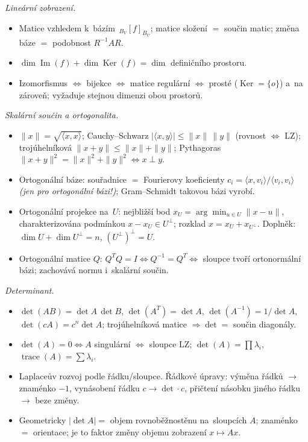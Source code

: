 \documentclass[11pt,a4paper]{article}
\newcommand{\Ker}{\operatorname{Ker}}
\newcommand{\tr}{\operatorname{trace}}
\begin{document}
\begin{poznamka}
\smallskip
\emph{Lineární zobrazení.}
\begin{itemize}
  \item Matice vzhledem k~bázím $\,{}_{B_V}[f]_{B_U}$; matice složení $=$ součin matic; změna báze $=$ podobnost $R^{-1}AR$.
  \item $\dim\operatorname{Im}(f)+\dim\Ker(f)=\dim$ definičního prostoru.
  \item Izomorfismus $\iff$ bijekce $\iff$ matice regulární $\iff$ prosté ($\Ker=\{o\}$) a~na zároveň; vyžaduje stejnou dimenzi obou prostorů.
\end{itemize}

\smallskip
\emph{Skalární součin a ortogonalita.}
\begin{itemize}
  \item $\|x\|=\sqrt{\langle x,x\rangle}$; Cauchy--Schwarz $|\langle x,y\rangle|\le\|x\|\,\|y\|$ (rovnost $\iff$ LZ); trojúhelníková $\|x+y\|\le\|x\|+\|y\|$; Pythagoras $\|x+y\|^2=\|x\|^2+\|y\|^2\iff x\perp y$.
  \item Ortogonální báze: souřadnice $=$ Fourierovy koeficienty $c_i=\langle x,v_i\rangle/\langle v_i,v_i\rangle$ \emph{(jen pro ortogonální bázi!)}; Gram--Schmidt takovou bázi vyrobí.
  \item Ortogonální projekce na~$U$: nejbližší bod $x_U=\arg\min_{u\in U}\|x-u\|$, charakterizována podmínkou $x-x_U\in U^\perp$; rozklad $x=x_U+x_{U^\perp}$. Doplněk: $\dim U+\dim U^\perp=n$, $(U^\perp)^\perp=U$.
  \item Ortogonální matice $Q$: $Q^TQ=I\iff Q^{-1}=Q^T\iff$ sloupce tvoří ortonormální bázi; zachovává normu i~skalární součin.
\end{itemize}

\smallskip
\emph{Determinant.}
\begin{itemize}
  \item $\det(AB)=\det A\,\det B$, $\det(A^T)=\det A$, $\det(A^{-1})=1/\det A$, $\det(cA)=c^n\det A$; trojúhelníková matice $\Rightarrow\det=$ součin diagonály.
  \item $\det(A)=0\iff A$ singulární $\iff$ sloupce LZ; $\det(A)=\prod\lambda_i$, $\tr(A)=\sum\lambda_i$.
  \item Laplaceův rozvoj podle řádku/sloupce. Řádkové úpravy: výměna řádků $\to$ znaménko $-1$, vynásobení řádku $c\to\det\cdot c$, přičtení násobku jiného řádku $\to$ beze změny.
  \item Geometricky $|\det A|=$ objem rovnoběžnostěnu na~sloupcích $A$; znaménko $=$ orientace; je to faktor změny objemu zobrazení $x\mapsto Ax$.
\end{itemize}


\end{poznamka}
\end{document}
